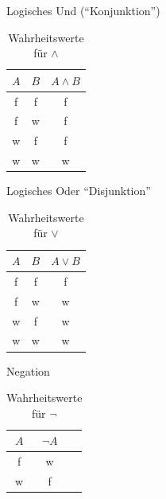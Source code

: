     \begin{frame}{Logisches Und ("`Konjunktion"')}
        \begin{table}
            \caption{Wahrheitswerte für $\wedge$}
            \begin{center}
                \begin{tabular}{ccc}
                    \toprule
                    $A$ & $B$ & $A \wedge B$\\
                    \midrule
                    f & f & f\\
                    f & w & f\\
                    w & f & f\\
                    w & w & w\\
                    \bottomrule
                \end{tabular}
             \end{center}
        \end{table}
    \end{frame}

    \begin{frame}{Logisches Oder "`Disjunktion"'}
        \begin{table}
            \caption{Wahrheitswerte für $\vee$}
            \begin{center}
                \begin{tabular}{ccc}
                    \toprule
                    $A$ & $B$ & $A \vee B$\\
                    \midrule
                    f & f & f\\
                    f & w & w\\
                    w & f & w\\
                    w & w & w\\
                    \bottomrule
                \end{tabular}
             \end{center}
        \end{table}
    \end{frame}

    \begin{frame}{Negation}
        \begin{table}
            \caption{Wahrheitswerte für $\neg$}
            \begin{center}
                \begin{tabular}{ccc}
                    \toprule
                    $A$ & $ \neg A$\\
                    \midrule
                    f & w\\
                    w & f\\
                    \bottomrule
                \end{tabular}
             \end{center}
        \end{table}
    \end{frame}


